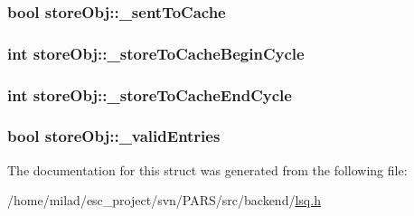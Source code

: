 \label{structstoreObj_ae4b43c4c368bb40a153821ae78f0958a}
\hypertarget{structstoreObj_a89e607394f02de57bd383ec70f79c1d9}{
\subsubsection[{\_\-sentToCache}]{\setlength{\rightskip}{0pt plus 5cm}bool {\bf storeObj::\_\-sentToCache}}}
\label{structstoreObj_a89e607394f02de57bd383ec70f79c1d9}
\hypertarget{structstoreObj_abe633ee683418741766efe4ad0ba1fac}{
\subsubsection[{\_\-storeToCacheBeginCycle}]{\setlength{\rightskip}{0pt plus 5cm}int {\bf storeObj::\_\-storeToCacheBeginCycle}}}
\label{structstoreObj_abe633ee683418741766efe4ad0ba1fac}
\hypertarget{structstoreObj_a585c7233f7b85b3c56ebba2a0300f037}{
\subsubsection[{\_\-storeToCacheEndCycle}]{\setlength{\rightskip}{0pt plus 5cm}int {\bf storeObj::\_\-storeToCacheEndCycle}}}
\label{structstoreObj_a585c7233f7b85b3c56ebba2a0300f037}
\hypertarget{structstoreObj_a6f4f02339e252cf86524f581afb11ae9}{
\subsubsection[{\_\-validEntries}]{\setlength{\rightskip}{0pt plus 5cm}bool {\bf storeObj::\_\-validEntries}}}
\label{structstoreObj_a6f4f02339e252cf86524f581afb11ae9}


The documentation for this struct was generated from the following file:\begin{DoxyCompactItemize}
\item 
/home/milad/esc\_\-project/svn/PARS/src/backend/\hyperlink{lsq_8h}{lsq.h}\end{DoxyCompactItemize}

